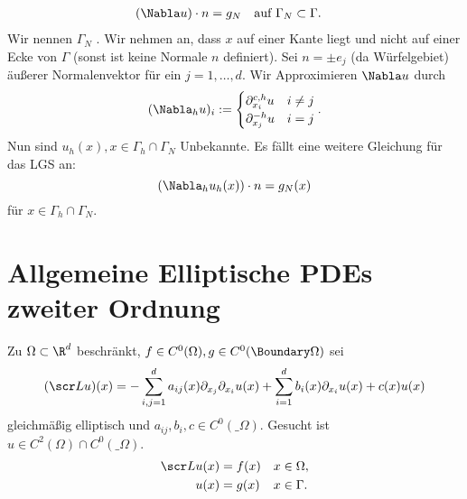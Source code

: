 \begin{ex}
\begin{note}
		\begin{align*}
			(\Nabla u) \cdot n &= g_N
			&& \text{auf $\Gamma_N \subset \Gamma$}.
		\end{align*}
		Wir nennen $\Gamma_N$ .
		Wir nehmen an, dass $x$ auf einer Kante liegt und nicht auf einer Ecke von $\Gamma$ (sonst ist keine Normale $n$ definiert).
		Sei $n = \pm e_j$ (da Würfelgebiet) äußerer Normalenvektor für ein $j = 1, \dotsc, d$.
		Wir Approximieren $\Nabla u$ durch
		\[
			(\Nabla_h u)_i :=
			\begin{cases}
				\partial_{x_i}^{c,h} u & i \neq j \\
				\partial_{x_j}^{-h} u & i = j
			\end{cases}.
		\]
		Nun sind $u_h(x), x \in \Gamma_h \cap \Gamma_N$ Unbekannte.
		Es fällt eine weitere Gleichung für das LGS an:
		\[
			(\Nabla_h u_h(x)) \cdot n = g_N(x)
		\]
		für $x \in \Gamma_h \cap \Gamma_N$.
	\end{note}
\end{ex}


\section{Allgemeine Elliptische PDEs zweiter Ordnung} \label{sec:2.2}

\begin{df} \label{2.10}
	Zu $\Omega \subset \R^d$ beschränkt, $f \in C^0(\Omega), g \in C^0(\Boundary \Omega)$ sei
	\begin{equation} \label{eq:2.3}
		(\scr L u)(x)
		= - \sum_{i,j=1}^d a_{ij}(x) \partial_{x_j} \partial_{x_i} u(x)
		+ \sum_{i=1}^d b_i(x) \partial_{x_i} u(x) + c(x) u(x)
	\end{equation}
	gleichmäßig elliptisch und $a_{ij}, b_i, c \in C^0(\_\Omega)$.
	Gesucht ist $u \in C^2(\Omega) \cap C^0(\_\Omega)$.
	\begin{align*}
		\scr L u(x) &= f(x) && \text{$x \in \Omega$}, \\
		u(x) &= g(x) && \text{$x\in\Gamma$}.
	\end{align*}
\end{df}

